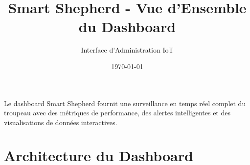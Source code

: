 \documentclass[a4paper,12pt]{article}
\title{\textbf{Smart Shepherd - Vue d'Ensemble du Dashboard}}
\author{Interface d'Administration IoT}
\date{\today}
\begin{document}
\maketitle

\begin{tcolorbox}[colback=primaryblue!10, colframe=primaryblue, title={\faIcon{tachometer-alt} \textbf{Tableau de Bord Intelligent}}]
Le dashboard Smart Shepherd fournit une surveillance en temps réel complet du troupeau avec des métriques de performance, des alertes intelligentes et des visualisations de données interactives.
\end{tcolorbox}

\section{Architecture du Dashboard}
\end{document}
